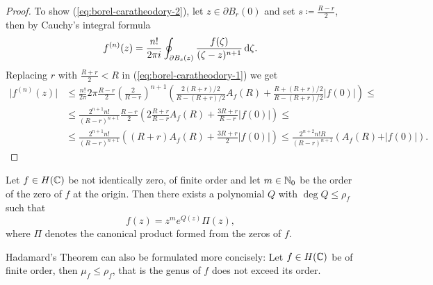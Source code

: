 \begin{proof}
    To show (\ref{eq:borel-caratheodory-2}), let $z \in \partial B_r(0)$ and set $s \coloneqq \frac{R - r}{2}$, then by Cauchy's integral formula
    \begin{equation*}
        f^{(n)}(z) = \frac{n!}{2 \pi i} \oint_{\partial B_s(z)} \frac{f(\zeta)}{(\zeta - z)^{n+1}} \mathop{}\!\mathrm{d} \zeta.
    \end{equation*}
    Replacing $r$ with $\frac{R + r}{2} < R$ in (\ref{eq:borel-caratheodory-1}) we get
    \begin{align*}
        \vert f^{(n)}(z) \vert &\leq \frac{n!}{2 \pi} 2 \pi \frac{R - r}{2} \left( \frac{2}{R - r} \right)^{n+1} \left( \frac{2 (R + r)/2}{R - (R+r)/2} A_f(R) + \frac{R + (R + r)/2}{R - (R + r)/2} \vert f(0) \vert \right) \leq \\
        &\leq \frac{2^{n+1} n!}{(R - r)^{n+1}} \frac{R - r}{2} \left( 2 \frac{R+r}{R-r} A_f(R) + \frac{3R + r}{R - r} \vert f(0) \vert \right) \leq \\
        &\leq \frac{2^{n+1} n!}{(R - r)^{n+1}} \left( (R+r) A_f(R) + \frac{3R + r}{2} \vert f(0) \vert \right) \leq \frac{2^{n+2} n! R}{(R - r)^{n+1}} (A_f(R) + \vert f(0) \vert).
    \end{align*}
\end{proof}

\begin{theorem}[Hadamard]
    Let $f \in H(\mathbb{C})$ be not identically zero, of finite order and let $m \in \mathbb{N}_0$ be the order of the zero of $f$ at the origin. Then there exists a polynomial $Q$ with $\deg Q \leq \rho_f$ such that
    \begin{equation}
        f(z) = z^m e^{Q(z)} \Pi(z),
    \end{equation}
    where $\Pi$ denotes the canonical product formed from the zeros of $f$.
\end{theorem}

Hadamard's Theorem can also be formulated more concisely: Let $f \in H(\mathbb{C})$ be of finite order, then $\mu_f \leq \rho_f$, that is the genus of $f$ does not exceed its order.

